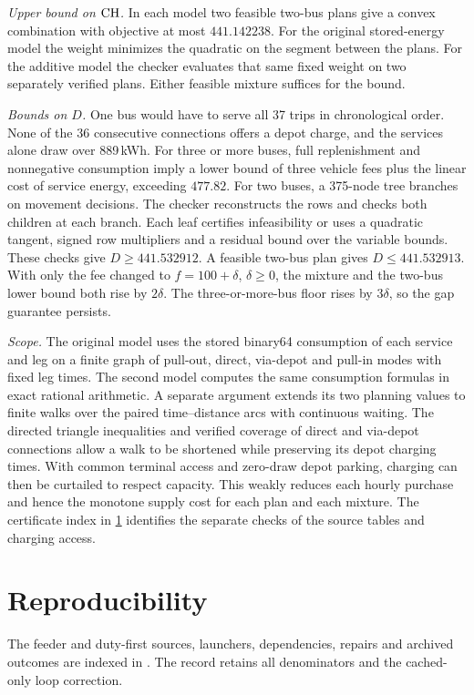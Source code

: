 \emph{Upper bound on $\mathrm{CH}$.} In each model two feasible two-bus plans give a
convex combination with objective at most $441.142238$. For the original
stored-energy model the weight minimizes the quadratic on the segment between
the plans. For the additive model the checker evaluates that same fixed weight
on two separately verified plans. Either feasible mixture suffices for the bound.

\emph{Bounds on $D$.} One bus would have to serve all 37 trips in chronological
order. None of the 36 consecutive connections offers a depot charge, and the
services alone draw over 889\,kWh. For three or more buses, full replenishment
and nonnegative consumption imply a lower bound of three vehicle fees plus the
linear cost of service energy, exceeding $477.82$. For two buses, a 375-node
tree branches on movement decisions. The checker reconstructs the rows and
checks both children at each branch. Each leaf certifies infeasibility or uses
a quadratic tangent, signed row multipliers and a residual bound over the
variable bounds. These checks give $D\ge441.532912$. A feasible two-bus plan
gives $D\le441.532913$. With only the fee changed to $f=100+\delta$,
$\delta\ge0$, the mixture and the two-bus lower bound both rise by $2\delta$.
The three-or-more-bus floor rises by $3\delta$, so the gap guarantee persists.

\emph{Scope.} The original model uses the stored binary64 consumption of each
service and leg on a finite graph of pull-out, direct, via-depot and pull-in
modes with fixed leg times. The second model computes the same consumption
formulas in exact rational arithmetic. A separate argument extends its two
planning values to finite walks over the paired time--distance arcs with
continuous waiting. The directed triangle inequalities and verified coverage of
direct and via-depot connections allow a walk to be shortened while preserving
its depot charging times. With common terminal access and zero-draw depot
parking, charging can then be curtailed to respect capacity. This weakly
reduces each hourly purchase and hence the monotone supply cost for each
plan and each mixture. The certificate index in \cref{app:repro} identifies
the separate checks of the source tables and charging access.

\section{Reproducibility}\label{app:repro}

The feeder and duty-first sources, launchers, dependencies, repairs and
archived outcomes are indexed in
.
The record retains all denominators and the cached-only loop correction.

